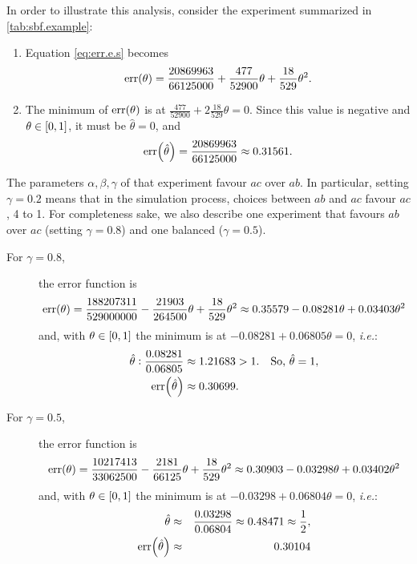 \documentclass{llncs}
\newcommand{\at}[1]{\ensuremath{\!\del{#1}}}
\newcommand{\err}[1]{\ensuremath{\mathrm{err}\at{#1}}}
\begin{document}
In order to illustrate this analysis, consider the experiment summarized in \cref{tab:sbf.example}:

\begin{enumerate}
    \item Equation \eqref{eq:err.e.s} becomes
          $$
              \err{\theta} = \frac{20869963}{66125000} + \frac{477}{52900}\theta + \frac{18}{529}\theta^2.
          $$
    \item The minimum of $\err{\theta}$ is at $\frac{477}{52900} + 2\frac{18}{529}\theta = 0$. Since this value is negative and $\theta \in \intcc{0,1}$, it must be $\hat{\theta} = 0$, and
          $$
              \err{\hat{\theta}} = \frac{20869963}{66125000} \approx 0.31561.
          $$
\end{enumerate}

The parameters $\alpha, \beta, \gamma$ of that experiment favour $ac$ over $ab$. In particular, setting $\gamma = 0.2$ means that in the simulation process, choices between $ab$ and $ac$ favour $ac$, 4 to 1. For completeness sake, we also describe one experiment that favours $ab$ over $ac$ (setting $\gamma=0.8$) and one balanced ($\gamma=0.5$).

\begin{description}
    \item[For $\gamma=0.8$,] the error function is
          \begin{equation*}
              \err{\theta} = \frac{188207311}{529000000} - \frac{21903}{264500} \theta + \frac{18}{529} \theta^{2} \approx 0.35579 - 0.08281 \theta + 0.03403 \theta ^2
          \end{equation*}
          and, with $\theta\in\intcc{0, 1}$ the minimum is at $-0.08281 + 0.06805 \theta = 0$, \emph{i.e.}:
          \begin{eqnarray*}
              \hat{\theta} :              \frac{0.08281}{0.06805} \approx 1.21683& >1. &\text{So,~} \hat{\theta} = 1, \\
              \err{\hat{\theta}} \approx  0.30699&.
          \end{eqnarray*}

    \item[For $\gamma=0.5$,] the error function is
          \begin{equation*}
              \err{\theta} = \frac{10217413}{33062500} - \frac{2181}{66125} \theta + \frac{18}{529} \theta^{2}\approx 0.30903 - 0.03298 \theta + 0.03402 \theta ^2
          \end{equation*}
          and, with $\theta\in\intcc{0, 1}$ the minimum is at $-0.03298 + 0.06804 \theta = 0$, \emph{i.e.}:
          \begin{eqnarray*}
              \hat{\theta}        &\approx &
              \frac{0.03298}{0.06804}
              \approx 0.48471
              \approx \frac{1}{2}, \\
              \err{\hat{\theta}}  &\approx &
              0.30104
          \end{eqnarray*}

\end{description}
\end{document}
